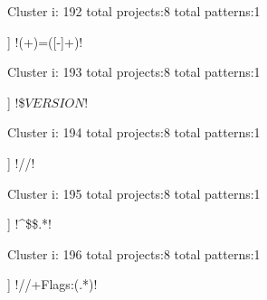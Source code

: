 Cluster i: 192
total projects:8
total patterns:1
\begin{multicols}{1}
\begin{description}[noitemsep,topsep=0pt]
\item [[8] ] \cverb!(\w+)=([-\w]+)!
\end{description}
\end{multicols}







Cluster i: 193
total projects:8
total patterns:1
\begin{multicols}{1}
\begin{description}[noitemsep,topsep=0pt]
\item [[8] ] \cverb!\$\(VERSION\)!
\end{description}
\end{multicols}







Cluster i: 194
total projects:8
total patterns:1
\begin{multicols}{1}
\begin{description}[noitemsep,topsep=0pt]
\item [[8] ] \cverb!\s*/\*\s*\*/!
\end{description}
\end{multicols}







Cluster i: 195
total projects:8
total patterns:1
\begin{multicols}{1}
\begin{description}[noitemsep,topsep=0pt]
\item [[8] ] \cverb!^\s*\$\$.*\n!
\end{description}
\end{multicols}







Cluster i: 196
total projects:8
total patterns:1
\begin{multicols}{1}
\begin{description}[noitemsep,topsep=0pt]
\item [[8] ] \cverb!//\s+Flags:(.*)!
\end{description}
\end{multicols}







